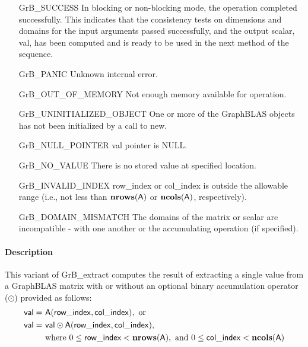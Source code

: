 \begin{itemize}[leftmargin=2.1in]
    \item[{\sf GrB\_SUCCESS}]  In blocking or non-blocking mode, the operation 
    completed successfully. This indicates that the consistency tests on 
    dimensions and domains for the input arguments passed successfully, and
    the output scalar, {\sf val}, has been computed and is ready to be used in 
    the next method of the sequence.

    \item[{\sf GrB\_PANIC}]   Unknown internal error.
    
    \item[{\sf GrB\_OUT\_OF\_MEMORY}]  Not enough memory available for operation.
    
    \item[{\sf GrB\_UNINITIALIZED\_OBJECT}]  One or more of the GraphBLAS 
    objects has not been initialized by a call to {\sf new}.
    
    \item[{\sf GrB\_NULL\_POINTER}]    {\sf val} pointer is {\sf NULL}.

    \item[{\sf GrB\_NO\_VALUE}]  There is no stored value at specified location.
    
    \item[{\sf GrB\_INVALID\_INDEX}]  {\sf row\_index} or {\sf col\_index} is 
    outside the allowable range (i.e., not less than $\bold{nrows}({\sf A})$ or
    $\bold{ncols}({\sf A})$, respectively).

    \item[{\sf GrB\_DOMAIN\_MISMATCH}]     The domains of the matrix or scalar
    are incompatible - with one another or the accumulating operation (if specified).
\end{itemize}

\paragraph{Description}

This variant of {\sf GrB\_extract} computes the result of extracting a single
value from a GraphBLAS matrix with or without an optional binary accumulation 
operator ($\odot$) provided as follows: 
\[
\begin{aligned}
    {\sf val} = &\ {\sf A}({\sf row\_index}, {\sf col\_index}), \mbox{~or~}
    \\
    {\sf val} = &\ {\sf val} \odot {\sf A}({\sf row\_index}, {\sf col\_index}),
    \\
    & \mbox{ where } 0 \leq {\sf row\_index} < \bold{nrows}({\sf A}), \mbox{ and }
    0 \leq {\sf col\_index} < \bold{ncols}({\sf A})
\end{aligned} 
\]

